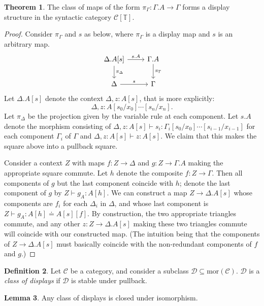 \documentclass{article}
\theoremstyle{definition}
\newtheorem{definition}{Definition}[section]
\newtheorem{theorem}[definition]{Theorem}
\newtheorem{lemma}[definition]{Lemma}
\newcommand{\T}{\mathbb T}
\newcommand{\C}{\mathcal C}
\newcommand{\D}{\mathcal D}
\newcommand{\syncat}[1]{\C [#1]}
\newcommand{\seq}{\doteq}
\newcommand{\mor}{\mathrm {mor}}
\begin{document}
\begin{theorem}\label{thm:syn-display}
    The class of maps of the form $\pi_\Gamma : \Gamma.A \to \Gamma$ forms a display structure in the syntactic category $\syncat{\T}$.
\end{theorem}
\begin{proof}
    Consider $\pi_\Gamma$ and $s$ as below, where $\pi_\Gamma$ is a display map and $s$ is an arbitrary map.
    \[
         \begin{tikzcd}
             \Delta.A[s] \ar[r,"s.A"] \ar[d,"\pi_\Delta"] & \Gamma.A \ar[d,"\pi_\Gamma"]
             \\ 
             \Delta \ar[r,"s"] & \Gamma
         \end{tikzcd}
    \]
    Let $\Delta.A[s]$ denote the context $\Delta, z: A[s]$, that is more explicitly: 
    \[\Delta, z: A[s_0/x_0]\cdots[s_n/x_n].\]
    Let $\pi_\Delta$ be the projection given by the variable rule at each component.
    Let $s.A$ denote the morphism consisting of $\Delta, z: A[s] \vdash s_i : \Gamma_i[s_0/x_0]\cdots[s_{i-1}/x_{i-1}]$ for each component $\Gamma_i$ of $\Gamma$ and $\Delta, z: A[s] \vdash z : A [s]$.
    We claim that this makes the square above into a pullback square.

    Consider a context $Z$ with maps $f: Z \to \Delta$ and $g: Z \to \Gamma.A$ making the appropriate square commute. Let $h$ denote the composite $f: Z \to \Gamma$. Then all components of $g$ but the last component coincide with $h$; denote the last component of $g$ by $Z \vdash g_A : A[h]$. We can construct a map $Z \to \Delta.A[s]$ whose components are $f_i$ for each $\Delta_i$ in $\Delta$, and whose last component is $Z \vdash g_A : A[h] \seq A[s][f]$. By construction, the two appropriate triangles commute, and any other $z: Z \to \Delta.A[s]$ making these two triangles commute will coincide with our constructed map. (The intuition being that the components of $Z \to \Delta.A[s]$ must basically coincide with the non-redundant components of $f$ and $g$.)
\end{proof}

\begin{definition}
    Let $\C$ be a category, and consider a subclass $\D \subseteq \mor (\C)$. $\D$ is a \emph{class of displays} if $\D$ is stable under pullback.
\end{definition}

\begin{lemma}
    Any class of displays is closed under isomorphism.
\end{lemma}
\end{document}

